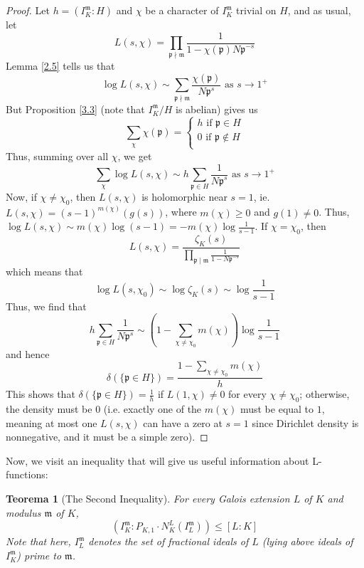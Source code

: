 \documentclass{article}
\theoremstyle{plain}
\newtheorem{thm}{Teorema}
\theoremstyle{definition}
\theoremstyle{remark}
\numberwithin{equation}{section}
\numberwithin{thm}{section}
\begin{document}
\begin{proof}
Let $h = (I_{K}^{\mathfrak{m}} : H)$ and $\chi$ be a character of $I_{K}^{\mathfrak{m}}$ trivial on $H$, and as usual, let $$L(s, \chi) = \prod_{\mathfrak{p} \nmid \mathfrak{m}} \frac{1}{1 - \chi(\mathfrak{p})N\mathfrak{p}^{-s}}$$ Lemma \ref{2.5} tells us that $$\log L(s, \chi) \sim \sum_{\mathfrak{p} \nmid \mathfrak{m}} \frac{\chi(\mathfrak{p})}{N\mathfrak{p}^{s}} \text{ as } s \to 1^{+}$$ But Proposition \ref{3.3} (note that $I_{K}^{\mathfrak{m}}/H$ is abelian) gives us $$\sum_{\chi} \chi(\mathfrak{p}) = 
\begin{cases}
h \text{ if } \mathfrak{p} \in H \\
0  \text { if } \mathfrak{p} \not\in H \\
\end{cases}$$ Thus, summing over all $\chi$, we get $$\sum_{\chi} \log L(s, \chi) \sim h \sum_{\mathfrak{p} \in H} \frac{1}{N\mathfrak{p}^{s}} \text{ as } s \to 1^{+}$$ Now, if $\chi \neq \chi_{0}$, then $L(s, \chi)$ is holomorphic near $s = 1$, ie. $L(s, \chi) = (s - 1)^{m(\chi)} (g(s))$, where $m(\chi) \geq 0$ and $g(1) \neq 0$. Thus, $\log L(s, \chi) \sim m(\chi)\log(s-1) = -m(\chi)\log\frac{1}{s - 1}$. If $\chi = \chi_{0}$, then $$L(s, \chi) = \frac{\zeta_K(s)}{\prod_{\mathfrak{p} \mid \mathfrak{m}} \frac{1}{1 - N\mathfrak{p}^{-s}}}$$ which means that $$\log L(s, \chi_{0}) \sim \log \zeta_K(s) \sim \log\frac{1}{s - 1}$$ Thus, we find that $$h \sum_{\mathfrak{p} \in H} \frac{1}{N\mathfrak{p}^{s}} \sim (1 - \sum_{\chi \neq \chi_{0}} m(\chi))\log\frac{1}{s-1}$$ and hence $$\delta(\{\mathfrak{p} \in H\}) = \frac{1 - \sum_{\chi \neq \chi_{0}} m(\chi)}{h}$$ This shows that $\delta(\{\mathfrak{p} \in H\}) = \frac{1}{h}$ if $L(1, \chi) \neq 0$ for every $\chi \neq \chi_{0}$; otherwise, the density must be $0$ (i.e. exactly one of the $m(\chi)$ must be equal to $1$, meaning at most one $L(s,\chi)$ can have a zero at $s = 1$ since Dirichlet density is nonnegative, and it must be a simple zero). 
\end{proof}

Now, we visit an inequality that will give us useful information about L-functions:

\begin{thm}[The Second Inequality]
For every Galois extension $L$ of $K$ and modulus $\mathfrak{m}$ of $K$, $$(I_{K}^{\mathfrak{m}} : P_{K, 1} \cdot N_{K}^{L}(I_{L}^{\mathfrak{m}})) \leq [L : K]$$ Note that here, $I_{L}^{\mathfrak{m}}$ denotes the set of fractional ideals of $L$ (lying above ideals of $I_{K}^{\mathfrak{m}}$) prime to $\mathfrak{m}$. 
\end{thm}
\end{document}
